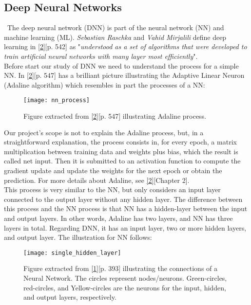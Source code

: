 \subsection{Deep Neural Networks}
\label{chap:Deep Neural Networks}

\quad \, The deep neural network (DNN) is part of the neural network (NN) and machine learning (ML). \textit{Sebastian Raschka} and \textit{Vahid Mirjalili} define deep learning in \hyperref[Bib:Python Machine Learning]{[2]}[p. 542] as "\textit{understood as a set of algorithms that were developed to train artificial neural networks with many layer most efficiently}".\\

Before start our study of DNN we need to understand the process for a simple NN. In \hyperref[Bib:Python Machine Learning]{[2]}[p. 547] has a brilliant picture illustrating the Adaptive Linear Neuron (Adaline algorithm) which resembles in part the processes of a NN:

\begin{figure}[H]
\label{fig:fig4}
\centering
\texttt{[image: nn\_process]}
\caption{Figure extracted from \hyperref[Bib:Python Machine Learning]{[2]}[p. 547] illustrating Adaline process.}
\end{figure}

Our project's scope is not to explain the Adaline process, but, in a straightforward explanation, the process consists in, for every epoch, a matrix multiplication between training data and weights plus bias, which the result is called net input. Then it is submitted to an activation function to compute the gradient update and update the weights for the next epoch or obtain the prediction. For more details about Adaline, see \hyperref[Bib:Python Machine Learning]{[2]}[Chapter 2].\\

This process is very similar to the NN, but only considers an input layer connected to the output layer without any hidden layer. The difference between this process and the NN process is that NN has a hidden-layer between the input and output layers. In other words, Adaline has two layers, and NN has three layers in total. Regarding DNN, it has an input layer, two or more hidden layers, and output layer. The illustration for NN follows:

\begin{figure}[H]
\label{fig:fig5}
\centering
\texttt{[image: single\_hidden\_layer]}
\caption{Figure extracted from \hyperref[Bib:The Elements Of Statistical Learning DataMining]{[1]}[p. 393] illustrating the connections of a Neural Network. The circles represent nodes/neurons. Green-circles, red-circles, and  Yellow-circles are the neurons for the input, hidden, and output layers, respectively.}
\end{figure}

